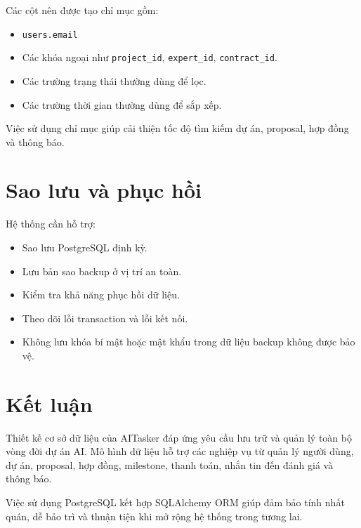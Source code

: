 Các cột nên được tạo chỉ mục gồm:

\begin{itemize}
    \item \texttt{users.email}
    \item Các khóa ngoại như \texttt{project\_id}, \texttt{expert\_id}, \texttt{contract\_id}.
    \item Các trường trạng thái thường dùng để lọc.
    \item Các trường thời gian thường dùng để sắp xếp.
\end{itemize}

Việc sử dụng chỉ mục giúp cải thiện tốc độ tìm kiếm dự án, proposal, hợp đồng và thông báo.

\section{Sao lưu và phục hồi}
\label{sec:backup-recovery}

Hệ thống cần hỗ trợ:

\begin{itemize}
    \item Sao lưu PostgreSQL định kỳ.
    \item Lưu bản sao backup ở vị trí an toàn.
    \item Kiểm tra khả năng phục hồi dữ liệu.
    \item Theo dõi lỗi transaction và lỗi kết nối.
    \item Không lưu khóa bí mật hoặc mật khẩu trong dữ liệu backup không được bảo vệ.
\end{itemize}

\section{Kết luận}
\label{sec:database-conclusion}

Thiết kế cơ sở dữ liệu của AITasker đáp ứng yêu cầu lưu trữ và quản lý toàn bộ vòng đời dự án AI. Mô hình dữ liệu hỗ trợ các nghiệp vụ từ quản lý người dùng, dự án, proposal, hợp đồng, milestone, thanh toán, nhắn tin đến đánh giá và thông báo.

Việc sử dụng PostgreSQL kết hợp SQLAlchemy ORM giúp đảm bảo tính nhất quán, dễ bảo trì và thuận tiện khi mở rộng hệ thống trong tương lai.
